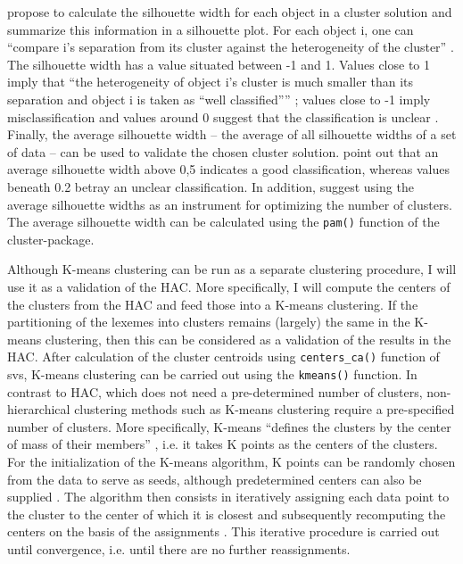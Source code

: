 \citet{kaufman_finding_1990} propose to calculate the silhouette width for each object in a cluster solution and summarize this information in a silhouette plot. For each object i, one can “compare i’s separation from its cluster against the heterogeneity of the cluster” \citep[138]{everitt_cluster_2011}. The silhouette width has a value situated between -1 and 1. Values close to 1 imply that “the heterogeneity of object i’s cluster is much smaller than its separation and object i is taken as ``well classified''” \citep[128]{everitt_cluster_2011}; values close to -1 imply misclassification and values around 0 suggest that the classification is unclear \citep[128]{everitt_cluster_2011}. Finally, the average silhouette width – the average of all silhouette widths of a set of data – can be used to validate the chosen cluster solution. \citet{kaufman_finding_1990} point out that an average silhouette width above 0,5 indicates a good classification, whereas values beneath 0.2 betray an unclear classification. In addition, \citet[129]{everitt_cluster_2011} suggest using the average silhouette widths as an instrument for optimizing the number of clusters. The average silhouette width can be calculated using the \texttt{pam()} function of the cluster{}-package.

Although K-means clustering can be run as a separate clustering procedure, I will use it as a validation of the HAC. More specifically, I will compute the centers of the clusters from the HAC and feed those into a K-means clustering. If the partitioning of the lexemes into clusters remains (largely) the same in the K-means clustering, then this can be considered as a validation of the results in the HAC. After calculation of the cluster centroids using \texttt{centers\_ca()} function of svs, K-means clustering can be carried out using the \texttt{kmeans()} function. In contrast to HAC, which does not need a pre-determined number of clusters, non-hierarchical clustering methods such as K-means clustering require a pre-specified number of clusters. More specifically, K-means “defines the clusters by the center of mass of their members” \citep[515]{manning_foundations_1999}, i.e. it takes K points as the centers of the clusters. For the initialization of the K-means algorithm, K points can be randomly chosen from the data to serve as seeds, although predetermined centers can also be supplied \citep[515]{manning_foundations_1999}. The algorithm then consists in iteratively assigning each data point to the cluster to the center of which it is closest \citep[515]{manning_foundations_1999} and subsequently recomputing the centers on the basis of the assignments \citep[515--516]{manning_foundations_1999}. This iterative procedure is carried out until convergence, i.e. until there are no further reassignments.

